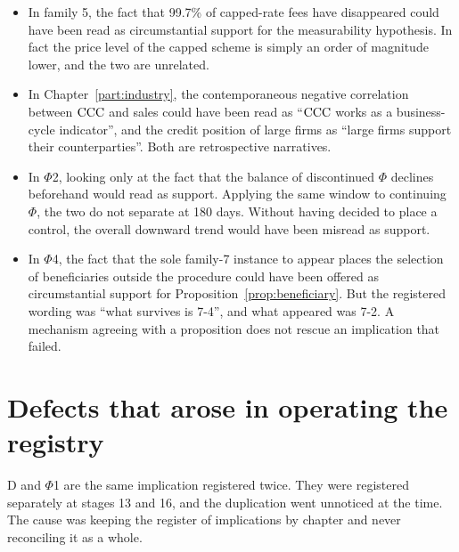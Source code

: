 \begin{itemize}
\item In family 5, the fact that 99.7\% of capped-rate fees have disappeared could have been read
as circumstantial support for the measurability hypothesis. In fact the price level of the capped
scheme is simply an order of magnitude lower, and the two are unrelated.

\item In Chapter~\ref{part:industry}, the contemporaneous negative correlation between $\mathrm{CCC}$ and
sales could have been read as ``$\mathrm{CCC}$ works as a business-cycle indicator'', and the credit
position of large firms as ``large firms support their counterparties''. Both are retrospective
narratives.

\item In $\Phi$2, looking only at the fact that the balance of discontinued $\Phi$ declines
beforehand would read as support. Applying the same window to continuing $\Phi$, the two do not
separate at 180 days. Without having decided to place a control, the overall downward trend would
have been misread as support.

\item In $\Phi$4, the fact that the sole family-7 instance to appear places the selection of
beneficiaries outside the procedure could have been offered as circumstantial support for
Proposition~\ref{prop:beneficiary}. But the registered wording was ``what survives is 7-4'', and
what appeared was 7-2. A mechanism agreeing with a proposition does not rescue an implication
that failed.
\end{itemize}

\section{Defects that arose in operating the registry}

D and $\Phi$1 are the same implication registered twice. They were registered separately at
stages 13 and 16, and the duplication went unnoticed at the time. The cause was keeping the
register of implications by chapter and never reconciling it as a whole.

